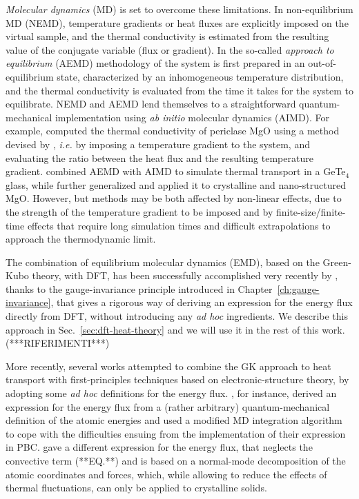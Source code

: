 \emph{Molecular dynamics} (MD) \cite{Allen1989,Frenkel2001} is set to overcome these limitations. 
In non-equilibrium MD (NEMD), \cite{Evans1990,Muller-Plathe1997} temperature gradients or heat fluxes are explicitly imposed on the virtual sample, and the thermal conductivity is estimated from the resulting value of the conjugate variable (flux or gradient). 
In the so-called \emph{approach to equilibrium} (AEMD) methodology of \citet{Lampin2013} the system is first prepared in an out-of-equilibrium state, characterized by an inhomogeneous temperature distribution, and the thermal conductivity is evaluated from the time it takes for the system to equilibrate. 
NEMD and AEMD lend themselves to a straightforward quantum-mechanical implementation \cite{Stackhouse2010b,Bouzid2017} using \emph{ab initio} molecular dynamics (AIMD). For example, \citet{Stackhouse2010b} computed the thermal conductivity of periclase MgO using a method devised by \citet{Müller-Plathe1997}, \emph{i.e.} by imposing a temperature gradient to the system, and evaluating the ratio between the heat flux and the resulting temperature gradient.
\citet{Bouzid2017} combined AEMD with AIMD to simulate thermal transport in a GeTe$_4$ glass, while \citet{Puligheddu2017} further generalized and applied it to crystalline and nano-structured MgO.
However, but methods may be both affected by non-linear effects, due to the strength of the temperature gradient to be imposed \cite{Schelling2002,He2012} and by finite-size/finite-time effects that require long simulation times and difficult extrapolations to approach the thermodynamic limit. \cite{sellan2010,He2011,He2012,Zaoui2016,Wang2017}

The combination of equilibrium molecular dynamics (EMD), based on the Green-Kubo theory, with DFT, has been successfully accomplished very recently by \citep{Marcolongo2016}, thanks to the gauge-invariance principle introduced in Chapter~\ref{ch:gauge-invariance}, that gives a rigorous way of deriving an expression for the energy flux directly from DFT, without introducing any \emph{ad hoc} ingredients. We describe this approach in Sec.~\ref{sec:dft-heat-theory} and we will use it in the rest of this work. (***RIFERIMENTI***)

More recently, several works attempted to combine the GK approach to heat transport with first-principles techniques based on electronic-structure theory, by adopting some \emph{ad hoc} definitions for the energy flux. \citet{Kang2017}, for instance, derived an expression for the energy flux from a (rather arbitrary) quantum-mechanical definition of the atomic energies and used a modified MD integration algorithm to cope with the difficulties ensuing from the implementation of their expression in PBC. 
\citet{Carbogno:2017gc} gave a different expression for the energy flux, that neglects the convective term (**EQ.**) and is based on a normal-mode decomposition of the atomic coordinates and forces, which, while allowing to reduce the effects of thermal fluctuations, can only be applied to crystalline solids.

